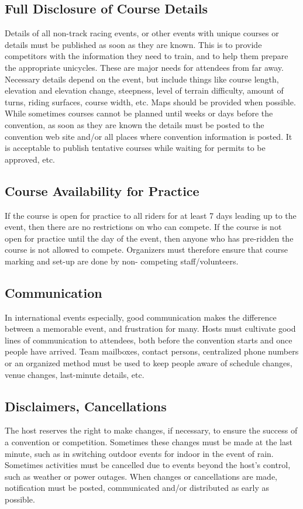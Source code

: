 \subsection{Full Disclosure of Course Details}
Details of all non-track racing events, or other events with unique courses or details must be published as soon as they are known. 
This is to provide competitors with the information they need to train, and to help them prepare the appropriate unicycles.
These are major needs for attendees from far away. 
Necessary details depend on the event, but include things like course length, elevation and elevation change, steepness, level of terrain difficulty, amount of turns, riding surfaces, course width, etc.
Maps should be provided when possible. 
While sometimes courses cannot be planned until weeks or days before the convention, as soon as they are known the details must be posted to the convention web site and/or all places where convention information is posted. 
It is acceptable to publish tentative courses while waiting for permits to be approved, etc.

\subsection{Course Availability for Practice}
If the course is open for practice to all riders for at least 7 days leading up to the event, then there are no restrictions on who can compete. 
If the course is not open for practice until the day of the event, then anyone who has pre-ridden the course is not allowed to compete. 
Organizers must therefore ensure that course marking and set-up are done by non- competing staff/volunteers.

\subsection{Communication}
In international events especially, good communication makes the difference between a memorable event, and frustration for many. 
Hosts must cultivate good lines of communication to attendees, both before the convention starts and once people have arrived. 
Team mailboxes, contact persons, centralized phone numbers or an organized method must be used to keep people aware of schedule changes, venue changes, last-minute details, etc.

\subsection{Disclaimers, Cancellations}
The host reserves the right to make changes, if necessary, to ensure the success of a convention or competition. 
Sometimes these changes must be made at the last minute, such as in switching outdoor events for indoor in the event of rain. 
Sometimes activities must be cancelled due to events beyond the host's control, such as weather or power outages. 
When changes or cancellations are made, notification must be posted, communicated and/or distributed as early as possible.

